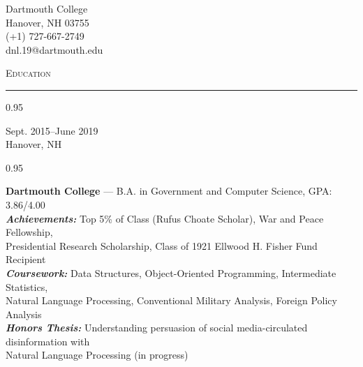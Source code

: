 \documentclass[a4paper,9pt]{article}
\newcommand{\mainMarginBottom}{\vspace*{2.5pt}}
\newcommand{\newLine}{\\}
\newcommand{\doubleColumnGap}{\hspace{4mm}}
\newcommand{\sectionMarginTopBottom}{\vspace*{9pt}}
\newcommand{\sectionMarginBetweenAdd}{\vspace{20pt}}
\newcommand{\mainLineSpacing}{0.95}
\newcommand{\titleMarginBelow}{\vspace*{2ex}}
\def\hrulefill{\leavevmode\leaders\hrule height 1.75pt\hfill\kern0pt}
\begin{document}
\begin{minipage}[b]{0.70\linewidth}
\end{minipage}
\begin{minipage}[b]{0.29\linewidth}
  \begin{flushright}
    \begin{small}
      Dartmouth College
      \newLine{}
      \mainMarginBottom{}
      Hanover, NH 03755
      \newLine{}
      \mainMarginBottom{}
      (+1) 727-667-2749
      \newLine{}
      \mainMarginBottom{}
      dnl.19@dartmouth.edu
    \end{small}
  \end{flushright}
\end{minipage}

\titleMarginBelow{}
\sectionMarginBetweenAdd{}

\hspace*{12pt}\textsc{\fontsize{20}{24}\selectfont Education}\hspace*{14pt}\hrulefill
\sectionMarginTopBottom{}

\begin{minipage}[t]{0.20\linewidth}
  \begin{small}
    \begin{spacing}\mainLineSpacing{}
      \begin{flushright}
        Sept. 2015--June 2019
        \newLine{}
        \mainMarginBottom{}
        Hanover, NH
      \end{flushright}
    \end{spacing}
  \end{small}
\end{minipage}
\doubleColumnGap{}
\begin{minipage}[t]{0.75\linewidth}
  \begin{small}
    \begin{spacing}\mainLineSpacing{}
      \begin{flushleft}
        \textbf{Dartmouth College} --- B.A. in Government and Computer Science, GPA: 3.86/4.00
        \newLine{}
        \mainMarginBottom{}
        \textit{\textbf{Achievements:}} Top 5\% of Class (Rufus Choate Scholar), War and Peace Fellowship,\\ Presidential Research Scholarship, Class of 1921 Ellwood H. Fisher Fund Recipient
        \newLine{}
        \mainMarginBottom{}
        \textit{\textbf{Coursework:}} Data Structures, Object-Oriented Programming, Intermediate Statistics,
        \\ Natural Language Processing, Conventional Military Analysis, Foreign Policy Analysis
        \newLine{}
        \mainMarginBottom{}
        \textit{\textbf{Honors Thesis:}} Understanding persuasion of social media-circulated disinformation with\\ Natural Language Processing (in progress)
      \end{flushleft}
    \end{spacing}
  \end{small}
\end{minipage}
\end{document}
